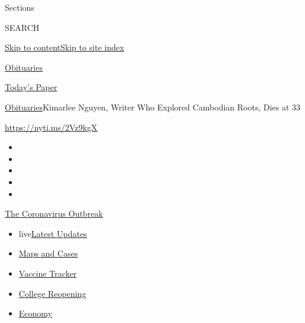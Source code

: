 Sections

SEARCH

\protect\hyperlink{site-content}{Skip to
content}\protect\hyperlink{site-index}{Skip to site index}

\href{https://www.nytimes.com/section/obituaries}{Obituaries}

\href{https://myaccount.nytimes.com/auth/login?response_type=cookie\&client_id=vi}{}

\href{https://www.nytimes.com/section/todayspaper}{Today's Paper}

\href{/section/obituaries}{Obituaries}\textbar{}Kimarlee Nguyen, Writer
Who Explored Cambodian Roots, Dies at 33

\url{https://nyti.ms/2Vz9kgX}

\begin{itemize}
\item
\item
\item
\item
\item
\end{itemize}

\href{https://www.nytimes.com/news-event/coronavirus?action=click\&pgtype=Article\&state=default\&region=TOP_BANNER\&context=storylines_menu}{The
Coronavirus Outbreak}

\begin{itemize}
\tightlist
\item
  live\href{https://www.nytimes.com/2020/08/03/world/coronavirus-covid-19.html?action=click\&pgtype=Article\&state=default\&region=TOP_BANNER\&context=storylines_menu}{Latest
  Updates}
\item
  \href{https://www.nytimes.com/interactive/2020/us/coronavirus-us-cases.html?action=click\&pgtype=Article\&state=default\&region=TOP_BANNER\&context=storylines_menu}{Maps
  and Cases}
\item
  \href{https://www.nytimes.com/interactive/2020/science/coronavirus-vaccine-tracker.html?action=click\&pgtype=Article\&state=default\&region=TOP_BANNER\&context=storylines_menu}{Vaccine
  Tracker}
\item
  \href{https://www.nytimes.com/2020/08/02/us/covid-college-reopening.html?action=click\&pgtype=Article\&state=default\&region=TOP_BANNER\&context=storylines_menu}{College
  Reopening}
\item
  \href{https://www.nytimes.com/live/2020/08/03/business/stock-market-today-coronavirus?action=click\&pgtype=Article\&state=default\&region=TOP_BANNER\&context=storylines_menu}{Economy}
\end{itemize}

